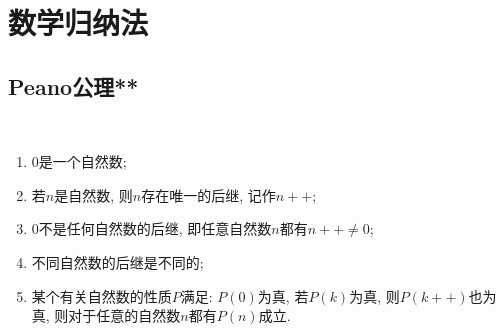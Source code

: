 \section{数学归纳法}
\subsection{Peano公理**}
\begin{axiom}
    \,
    \begin{enumerate}
        \item \(0\)是一个自然数;
        \item 若\(n\)是自然数, 则\(n\)存在唯一的后继, 记作\(n++\);
        \item \(0\)不是任何自然数的后继, 即任意自然数\(n\)都有\(n++\neq 0\);
        \item 不同自然数的后继是不同的;
        \item 某个有关自然数的性质\(P\)满足: \(P(0)\)为真, 
        若\(P(k)\)为真, 则\(P(k++)\)也为真, 则对于任意的自然数\(n\)都有\(P(n)\)成立.
    \end{enumerate}
\end{axiom}




















\clearpage
